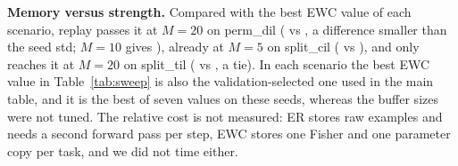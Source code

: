 \textbf{Memory versus strength.} Compared with the best EWC value of each scenario, replay passes it at $M{=}20$ on perm\_dil ( vs , a difference smaller than the seed std; $M{=}10$ gives ), already at $M{=}5$ on split\_cil ( vs ), and only reaches it at $M{=}20$ on split\_til ( vs , a tie). In each scenario the best EWC value in Table~\ref{tab:sweep} is also the validation-selected one used in the main table, and it is the best of seven values on these seeds, whereas the buffer sizes were not tuned. The relative cost is not measured: ER stores raw examples and needs a second forward pass per step, EWC stores one Fisher and one parameter copy per task, and we did not time either.
